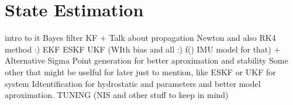 \section{State Estimation}

intro to it
Bayes filter
KF + Talk about propagation Newton and also RK4 method :)
EKF
ESKF
UKF (WIth bias and all :) f() IMU model for that) + Alternative Sigma Point generation for better aproximation and stability
Some other that might be uselful for later just to mention, like ESKF or UKF for system Idtentification for hydrostatic and parameters and better model aproximation.
TUNING (NIS and other stuff to keep in mind)
